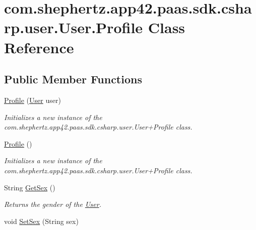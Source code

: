 \hypertarget{classcom_1_1shephertz_1_1app42_1_1paas_1_1sdk_1_1csharp_1_1user_1_1_user_1_1_profile}{\section{com.\+shephertz.\+app42.\+paas.\+sdk.\+csharp.\+user.\+User.\+Profile Class Reference}
\label{classcom_1_1shephertz_1_1app42_1_1paas_1_1sdk_1_1csharp_1_1user_1_1_user_1_1_profile}
}
\subsection*{Public Member Functions}
\begin{DoxyCompactItemize}
\item 
\hyperlink{classcom_1_1shephertz_1_1app42_1_1paas_1_1sdk_1_1csharp_1_1user_1_1_user_1_1_profile_a46ca02109de743bdbfd2c976452cca95}{Profile} (\hyperlink{classcom_1_1shephertz_1_1app42_1_1paas_1_1sdk_1_1csharp_1_1user_1_1_user}{User} user)
\begin{DoxyCompactList}\small\item\em Initializes a new instance of the com.\+shephertz.\+app42.\+paas.\+sdk.\+csharp.\+user.\+User+\+Profile class. \end{DoxyCompactList}\item 
\hyperlink{classcom_1_1shephertz_1_1app42_1_1paas_1_1sdk_1_1csharp_1_1user_1_1_user_1_1_profile_afdbfb1f20351d410f65b1cfdc0cc78ca}{Profile} ()
\begin{DoxyCompactList}\small\item\em Initializes a new instance of the com.\+shephertz.\+app42.\+paas.\+sdk.\+csharp.\+user.\+User+\+Profile class. \end{DoxyCompactList}\item 
String \hyperlink{classcom_1_1shephertz_1_1app42_1_1paas_1_1sdk_1_1csharp_1_1user_1_1_user_1_1_profile_a97a39b76755572d18507d1c6d9500778}{Get\+Sex} ()
\begin{DoxyCompactList}\small\item\em Returns the gender of the \hyperlink{classcom_1_1shephertz_1_1app42_1_1paas_1_1sdk_1_1csharp_1_1user_1_1_user}{User}. \end{DoxyCompactList}\item 
void \hyperlink{classcom_1_1shephertz_1_1app42_1_1paas_1_1sdk_1_1csharp_1_1user_1_1_user_1_1_profile_ad06f92f28a23213a5bb1ec11ad2755ad}{Set\+Sex} (String sex)

\end{DoxyCompactItemize}
